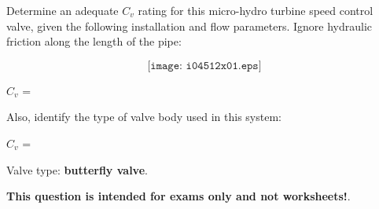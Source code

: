 

Determine an adequate $C_v$ rating for this micro-hydro turbine speed control valve, given the following installation and flow parameters.  Ignore hydraulic friction along the length of the pipe:

$$\texttt{[image: i04512x01.eps]}$$

$C_v$ = \underbar{\hskip 50pt}

\vskip 10pt

Also, identify the type of valve body used in this system:







$C_v$ = 

\vskip 10pt

Valve type: {\bf butterfly valve}.







{\bf This question is intended for exams only and not worksheets!}.



